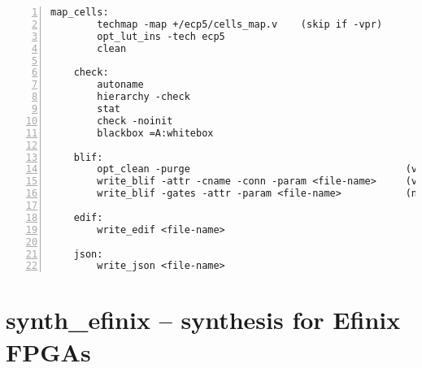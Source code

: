 \begin{lstlisting}[numbers=left,frame=single]
    map_cells:
        techmap -map +/ecp5/cells_map.v    (skip if -vpr)
        opt_lut_ins -tech ecp5
        clean

    check:
        autoname
        hierarchy -check
        stat
        check -noinit
        blackbox =A:whitebox

    blif:
        opt_clean -purge                                     (vpr mode)
        write_blif -attr -cname -conn -param <file-name>     (vpr mode)
        write_blif -gates -attr -param <file-name>           (non-vpr mode)

    edif:
        write_edif <file-name>

    json:
        write_json <file-name>
\end{lstlisting}

\section{synth\_efinix -- synthesis for Efinix FPGAs}
\label{cmd:synth_efinix}
